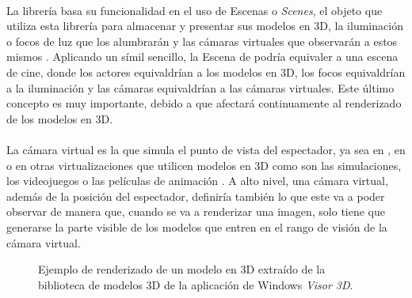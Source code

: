 \documentclass{subfiles}
\begin{document}
        \paragraph{}
        La librería \threejs basa su funcionalidad en el uso de Escenas o \textit{Scenes}, el objeto que utiliza esta librería para almacenar y presentar sus modelos en 3D, la iluminación o focos de luz que los alumbrarán y las cámaras virtuales que observarán a estos mismos \cite{web:threejs_scene}. Aplicando un símil sencillo, la Escena de \threejs podría equivaler a una escena de cine, donde los actores equivaldrían a los modelos en 3D, los focos equivaldrían a la iluminación y las cámaras equivaldrían a las cámaras virtuales. Este último concepto es muy importante, debido a que afectará continuamente al renderizado de los modelos en 3D.

        \paragraph{}
        La cámara virtual es la que simula el punto de vista del espectador, ya sea en \ra, en \rv o en otras virtualizaciones que utilicen modelos en 3D como son las simulaciones, los videojuegos o las películas de animación \cite{web:mozilla_virtualcamera}. A alto nivel, una cámara virtual, además de la posición del espectador, definiría también lo que este va a poder observar de manera que, cuando se va a renderizar una imagen, solo tiene que generarse la parte visible de los modelos que entren en el rango de visión de la cámara virtual.

        \begin{figure}
        \centering
        \caption{Ejemplo de renderizado de un modelo en 3D extraído de la biblioteca de modelos 3D de la aplicación de Windows \textit{Visor 3D}.}
        \label{fig:tortuga_marina}
        \end{figure}
\end{document}
